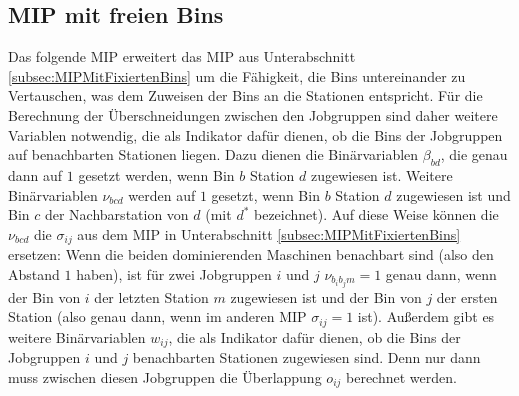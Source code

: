 \documentclass{scrreprt}
\begin{document}
\subsection{MIP mit freien Bins}
\label{subsec:MIPMitFreienBins}
Das folgende MIP erweitert das MIP aus Unterabschnitt \ref{subsec:MIPMitFixiertenBins} um die Fähigkeit, die Bins untereinander zu Vertauschen,
was dem Zuweisen der Bins an die Stationen entspricht.
Für die Berechnung der Überschneidungen zwischen den Jobgruppen sind daher weitere Variablen notwendig, die als Indikator dafür dienen,
ob die Bins der Jobgruppen auf benachbarten Stationen liegen.
Dazu dienen die Binärvariablen $\beta_{bd}$, die genau dann auf $1$ gesetzt werden, wenn Bin $b$ Station $d$ zugewiesen ist.
Weitere Binärvariablen $\nu_{bcd}$ werden auf $1$ gesetzt, wenn Bin $b$ Station $d$ zugewiesen ist und Bin $c$ der Nachbarstation von $d$ (mit $d^*$ bezeichnet).
Auf diese Weise können die $\nu_{bcd}$ die $\sigma_{ij}$ aus dem MIP in Unterabschnitt \ref{subsec:MIPMitFixiertenBins} ersetzen:
Wenn die beiden dominierenden Maschinen benachbart sind (also den Abstand $1$ haben), ist für zwei Jobgruppen $i$ und $j$ $\nu_{b_ib_jm}=1$ genau dann, 
wenn der Bin von $i$ der letzten Station $m$ zugewiesen ist und der Bin von $j$ der ersten Station (also genau dann, wenn im anderen MIP $\sigma_{ij}=1$ ist).
Außerdem gibt es weitere Binärvariablen $w_{ij}$, die als Indikator dafür dienen, ob die Bins der Jobgruppen $i$ und $j$ benachbarten Stationen zugewiesen sind.
Denn nur dann muss zwischen diesen Jobgruppen die Überlappung $o_{ij}$ berechnet werden.
\end{document}
